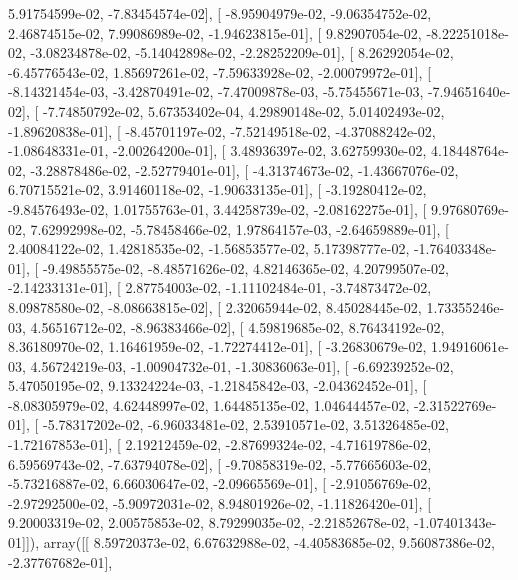 \documentclass{article}
\begin{document}
          5.91754599e-02,  -7.83454574e-02],
       [ -8.95904979e-02,  -9.06354752e-02,   2.46874515e-02,
          7.99086989e-02,  -1.94623815e-01],
       [  9.82907054e-02,  -8.22251018e-02,  -3.08234878e-02,
         -5.14042898e-02,  -2.28252209e-01],
       [  8.26292054e-02,  -6.45776543e-02,   1.85697261e-02,
         -7.59633928e-02,  -2.00079972e-01],
       [ -8.14321454e-03,  -3.42870491e-02,  -7.47009878e-03,
         -5.75455671e-03,  -7.94651640e-02],
       [ -7.74850792e-02,   5.67353402e-04,   4.29890148e-02,
          5.01402493e-02,  -1.89620838e-01],
       [ -8.45701197e-02,  -7.52149518e-02,  -4.37088242e-02,
         -1.08648331e-01,  -2.00264200e-01],
       [  3.48936397e-02,   3.62759930e-02,   4.18448764e-02,
         -3.28878486e-02,  -2.52779401e-01],
       [ -4.31374673e-02,  -1.43667076e-02,   6.70715521e-02,
          3.91460118e-02,  -1.90633135e-01],
       [ -3.19280412e-02,  -9.84576493e-02,   1.01755763e-01,
          3.44258739e-02,  -2.08162275e-01],
       [  9.97680769e-02,   7.62992998e-02,  -5.78458466e-02,
          1.97864157e-03,  -2.64659889e-01],
       [  2.40084122e-02,   1.42818535e-02,  -1.56853577e-02,
          5.17398777e-02,  -1.76403348e-01],
       [ -9.49855575e-02,  -8.48571626e-02,   4.82146365e-02,
          4.20799507e-02,  -2.14233131e-01],
       [  2.87754003e-02,  -1.11102484e-01,  -3.74873472e-02,
          8.09878580e-02,  -8.08663815e-02],
       [  2.32065944e-02,   8.45028445e-02,   1.73355246e-03,
          4.56516712e-02,  -8.96383466e-02],
       [  4.59819685e-02,   8.76434192e-02,   8.36180970e-02,
          1.16461959e-02,  -1.72274412e-01],
       [ -3.26830679e-02,   1.94916061e-03,   4.56724219e-03,
         -1.00904732e-01,  -1.30836063e-01],
       [ -6.69239252e-02,   5.47050195e-02,   9.13324224e-03,
         -1.21845842e-03,  -2.04362452e-01],
       [ -8.08305979e-02,   4.62448997e-02,   1.64485135e-02,
          1.04644457e-02,  -2.31522769e-01],
       [ -5.78317202e-02,  -6.96033481e-02,   2.53910571e-02,
          3.51326485e-02,  -1.72167853e-01],
       [  2.19212459e-02,  -2.87699324e-02,  -4.71619786e-02,
          6.59569743e-02,  -7.63794078e-02],
       [ -9.70858319e-02,  -5.77665603e-02,  -5.73216887e-02,
          6.66030647e-02,  -2.09665569e-01],
       [ -2.91056769e-02,  -2.97292500e-02,  -5.90972031e-02,
          8.94801926e-02,  -1.11826420e-01],
       [  9.20003319e-02,   2.00575853e-02,   8.79299035e-02,
         -2.21852678e-02,  -1.07401343e-01]]), array([[  8.59720373e-02,   6.67632988e-02,  -4.40583685e-02,
          9.56087386e-02,  -2.37767682e-01],
\end{document}
